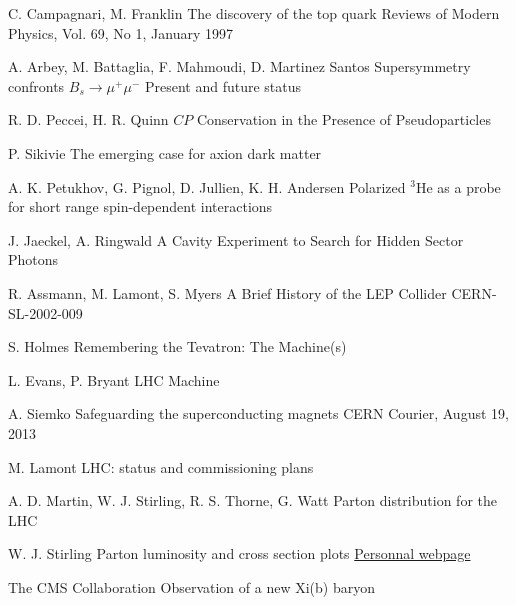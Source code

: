 

\begin{thebibliography}{2}


\singlespace

{C. Campagnari, M. Franklin}
{The discovery of the top quark}
{Reviews of Modern Physics, Vol. 69, No 1, January 1997}

{A. Arbey, M. Battaglia, F. Mahmoudi, D. Martinez Santos}
{Supersymmetry confronts $B_s \rightarrow \mu^+ \mu^-$ Present and future status}
{}

{R. D. Peccei, H. R. Quinn}
{$CP$ Conservation in the Presence of Pseudoparticles}
{}

{P. Sikivie}
{The emerging case for axion dark matter}
{}

{A. K. Petukhov, G. Pignol, D. Jullien, K. H. Andersen}
{Polarized $^3$He as a probe for short range spin-dependent interactions}
{}

{J. Jaeckel, A. Ringwald}
{A Cavity Experiment to Search for Hidden Sector Photons}
{}

{R. Assmann, M. Lamont, S. Myers}
{A Brief History of the LEP Collider}
{CERN-SL-2002-009}

{S. Holmes}
{Remembering the Tevatron: The Machine(s)}
{}

{L. Evans, P. Bryant}
{LHC Machine}
{}

{A. Siemko}
{Safeguarding the superconducting magnets}
{CERN Courier, August 19, 2013}

{M. Lamont}
{LHC: status and commissioning plans}
{}

{A. D. Martin, W. J. Stirling, R. S. Thorne, G. Watt}
{Parton distribution for the LHC}
{}

{W. J. Stirling}
{Parton luminosity and cross section plots}
{\href{http://www.hep.ph.ic.ac.uk/~wstirlin/plots/plots.html}{Personnal webpage}}

{The CMS Collaboration}
{Observation of a new Xi(b) baryon}
{}


\end{thebibliography}
